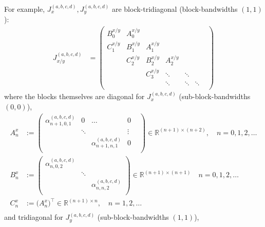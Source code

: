 \documentclass[11pt, oneside]{article}   	%
\newcommand{\R}{\mathbb{R}}
\newcommand{\alphaabcd}{\alpha^{(a,b,c,d)}}
\begin{document}
For example, $J_x^{(a,b,c,d)}, J_y^{(a,b,c,d)}$ are block-tridiagonal (block-bandwidths $(1,1)$):
\begin{align*}
J_{x/y}^{(a,b,c,d)} &= \begin{pmatrix}
		B^{x/y}_0 & A^{x/y}_0 & & & & \\
		C^{x/y}_1 & B^{x/y}_1 & A^{x/y}_1 & & & \\
		& C^{x/y}_2 & B^{x/y}_2 & A^{x/y}_2  & & & \\
		& & C^{x/y}_3 & \ddots & \ddots & \\
		& & & \ddots & \ddots & \ddots \\
	\end{pmatrix}
\end{align*}
where the blocks themselves are diagonal for $J_x^{(a,b,c,d)}$ (sub-block-bandwidths $(0,0)$),
\begin{align*}
A^x_n &:= \begin{pmatrix}
		\alphaabcd_{n+1,0,1} & 0 & \hdots & 0 \\
		& \ddots & & \vdots & \\
		& & \alphaabcd_{n+1,n,1} & 0 \\
	    \end{pmatrix} \in \R^{(n+1)\times(n+2)}, \quad n = 0,1,2,\dots \\
B^x_n &:= \begin{pmatrix}
		\alphaabcd_{n,0,2} & & \\
		& \ddots & \\
		& & \alphaabcd_{n,n,2} \\
	    \end{pmatrix} \in \R^{(n+1)\times(n+1)} \quad n = 0,1,2,\dots \\
C^x_n &:= \big( A^x_n \big)^\top \in \R^{(n+1)\times n},  \quad n = 1,2,\dots \\ 
\nonumber
\end{align*}
and tridiagonal for $J_y^{(a,b,c,d)}$ (sub-block-bandwidths $(1,1)$),
\end{document}
